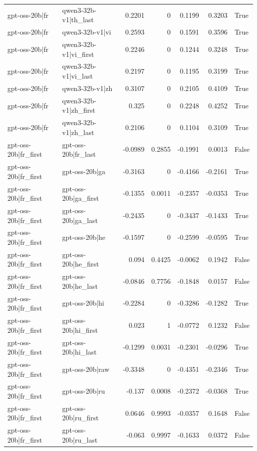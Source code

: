 \begin{table}
\begin{tabular}{l l r r r r l}
gpt-oss-20b|fr & qwen3-32b-v1|th_last & 0.2201 & 0 & 0.1199 & 0.3203 & True \\
gpt-oss-20b|fr & qwen3-32b-v1|vi & 0.2593 & 0 & 0.1591 & 0.3596 & True \\
gpt-oss-20b|fr & qwen3-32b-v1|vi_first & 0.2246 & 0 & 0.1244 & 0.3248 & True \\
gpt-oss-20b|fr & qwen3-32b-v1|vi_last & 0.2197 & 0 & 0.1195 & 0.3199 & True \\
gpt-oss-20b|fr & qwen3-32b-v1|zh & 0.3107 & 0 & 0.2105 & 0.4109 & True \\
gpt-oss-20b|fr & qwen3-32b-v1|zh_first & 0.325 & 0 & 0.2248 & 0.4252 & True \\
gpt-oss-20b|fr & qwen3-32b-v1|zh_last & 0.2106 & 0 & 0.1104 & 0.3109 & True \\
gpt-oss-20b|fr_first & gpt-oss-20b|fr_last & -0.0989 & 0.2855 & -0.1991 & 0.0013 & False \\
gpt-oss-20b|fr_first & gpt-oss-20b|ga & -0.3163 & 0 & -0.4166 & -0.2161 & True \\
gpt-oss-20b|fr_first & gpt-oss-20b|ga_first & -0.1355 & 0.0011 & -0.2357 & -0.0353 & True \\
gpt-oss-20b|fr_first & gpt-oss-20b|ga_last & -0.2435 & 0 & -0.3437 & -0.1433 & True \\
gpt-oss-20b|fr_first & gpt-oss-20b|he & -0.1597 & 0 & -0.2599 & -0.0595 & True \\
gpt-oss-20b|fr_first & gpt-oss-20b|he_first & 0.094 & 0.4425 & -0.0062 & 0.1942 & False \\
gpt-oss-20b|fr_first & gpt-oss-20b|he_last & -0.0846 & 0.7756 & -0.1848 & 0.0157 & False \\
gpt-oss-20b|fr_first & gpt-oss-20b|hi & -0.2284 & 0 & -0.3286 & -0.1282 & True \\
gpt-oss-20b|fr_first & gpt-oss-20b|hi_first & 0.023 & 1 & -0.0772 & 0.1232 & False \\
gpt-oss-20b|fr_first & gpt-oss-20b|hi_last & -0.1299 & 0.0031 & -0.2301 & -0.0296 & True \\
gpt-oss-20b|fr_first & gpt-oss-20b|raw & -0.3348 & 0 & -0.4351 & -0.2346 & True \\
gpt-oss-20b|fr_first & gpt-oss-20b|ru & -0.137 & 0.0008 & -0.2372 & -0.0368 & True \\
gpt-oss-20b|fr_first & gpt-oss-20b|ru_first & 0.0646 & 0.9993 & -0.0357 & 0.1648 & False \\
gpt-oss-20b|fr_first & gpt-oss-20b|ru_last & -0.063 & 0.9997 & -0.1633 & 0.0372 & False \\

\end{tabular}
\end{table}

